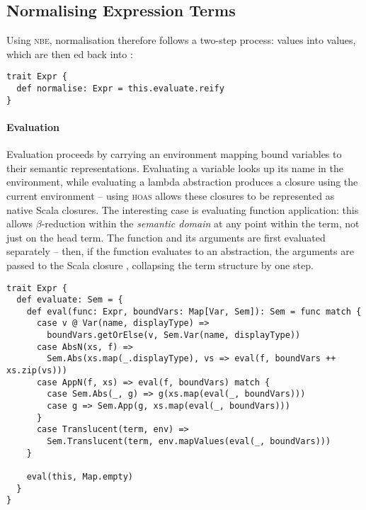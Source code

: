 \documentclass[../../../main.tex]{subfiles}
\begin{document}
\subsection{Normalising Expression Terms}
Using \textsc{nbe}, normalisation therefore follows a two-step process:  values  into  values, which are then ed back into :
\begin{verbatim}
trait Expr {
  def normalise: Expr = this.evaluate.reify
}
\end{verbatim}
%
\paragraph{Evaluation}
Evaluation proceeds by carrying an environment mapping bound variables to their semantic representations.
Evaluating a variable looks up its name in the environment, while evaluating a lambda abstraction produces a closure using the current environment -- using \textsc{hoas} allows these closures to be represented as native Scala closures.
The interesting case is evaluating function application: this allows $\beta$-reduction within the \emph{semantic domain} at any point within the term, not just on the head term.
The function and its arguments are first evaluated separately -- then, if the function evaluates to an abstraction, the arguments are passed to the Scala closure , collapsing the term structure by one step.
%
\begin{verbatim}
trait Expr {
  def evaluate: Sem = {
    def eval(func: Expr, boundVars: Map[Var, Sem]): Sem = func match {
      case v @ Var(name, displayType) =>
        boundVars.getOrElse(v, Sem.Var(name, displayType))
      case AbsN(xs, f) =>
        Sem.Abs(xs.map(_.displayType), vs => eval(f, boundVars ++ xs.zip(vs)))
      case AppN(f, xs) => eval(f, boundVars) match {
        case Sem.Abs(_, g) => g(xs.map(eval(_, boundVars)))
        case g => Sem.App(g, xs.map(eval(_, boundVars)))
      }
      case Translucent(term, env) =>
        Sem.Translucent(term, env.mapValues(eval(_, boundVars)))
    }

    eval(this, Map.empty)
  }
}
\end{verbatim}
%
\end{document}
